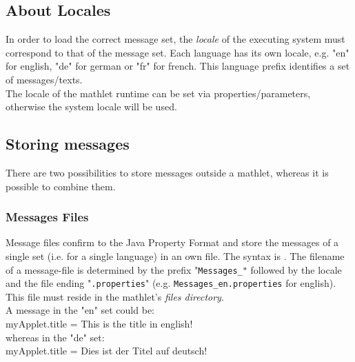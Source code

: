   \subsection{About Locales}
  In order to load the correct message set, the \textit{locale} of the executing system must 
  correspond to that of the message set.
  Each language has its own locale, e.g. "en" for english, "de" for german or
  "fr" for french. This language prefix identifies a set of messages/texts.\\
  The locale of the mathlet runtime can be set via properties/parameters, otherwise the system
  locale will be used.
  
  \subsection{Storing messages}
  
  There are two possibilities to store messages outside a mathlet, whereas it is possible to combine them.

  \subsubsection{Messages Files}
  Message files confirm to the Java Property Format and store the messages of a single set
  (i.e. for a single language) in an own file. The syntax is .
  The filename of a message-file is determined by the prefix
 "{\tt Messages\_"} followed by the locale and the file ending "{\tt .properties}"
  (e.g. {\tt Messages\_en.properties} for english). This file must reside in the mathlet's \textit{files directory}.\\
  A message in the "en" set could be:\\
  \indent myApplet.title = This is the title in english!\\
  whereas in the "de" set:\\
  \indent myApplet.title = Dies ist der Titel auf deutsch!\\
  
